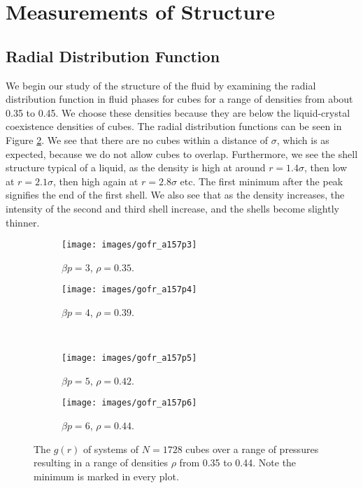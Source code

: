 \documentclass[thesis]{subfiles}
\begin{document}
\newpage

\section{Measurements of Structure}

\subsection{Radial Distribution Function} \label{subsec:res_rdf}

We begin our study of the structure of the fluid by examining the radial distribution function in fluid phases for cubes for a range of densities from about 0.35 to 0.45. We choose these densities because they are below the liquid-crystal coexistence densities of cubes. The radial distribution functions can be seen in Figure \ref{fig:gofr_90liq}. We see that there are no cubes within a distance of $\sigma$, which is as expected, because we do not allow cubes to overlap. Furthermore, we see the shell structure typical of a liquid, as the density is high at around $r=1.4\sigma$, then low at $r=2.1\sigma$, then high again at $r=2.8\sigma$ etc.
The first minimum after the peak signifies the end of the first shell. We also see that as the density increases, the intensity of the second and third shell increase, and the shells become slightly thinner.

\begin{figure}[h]
	\centering
	\begin{subfigure}{0.49\textwidth}
		\texttt{[image: images/gofr\_a157p3]}
		\caption{$\beta p = 3$, $\rho = 0.35$. }
	\end{subfigure}
	\begin{subfigure}{0.49\textwidth}
		\texttt{[image: images/gofr\_a157p4]}
		\caption{$\beta p = 4$, $\rho = 0.39$. }
	\end{subfigure}
\\
\vspace{10pt}
	\begin{subfigure}{0.49\textwidth}
		\texttt{[image: images/gofr\_a157p5]}
		\caption{$\beta p = 5$, $\rho = 0.42$. }
	\end{subfigure}
	\begin{subfigure}{0.49\textwidth}
		\texttt{[image: images/gofr\_a157p6]}
		\caption{$\beta p = 6$, $\rho = 0.44$. }\label{fig:gofr_90liqp6}
	\end{subfigure}

	\caption{The $g(r)$ of systems of $N = 1728$ cubes over a range of pressures resulting in a range of densities $\rho$ from 0.35 to 0.44. Note the minimum is marked in every plot.}\label{fig:gofr_90liq}
\end{figure}
\end{document}
